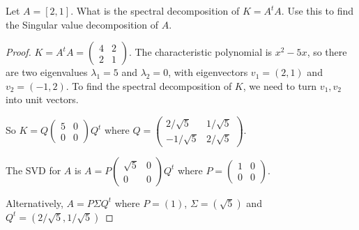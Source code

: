 \documentclass{amsart}
\begin{document}
	
\vspace{2em}

Let $A=[2,1]$. What is the spectral decomposition of $K=A^tA$. Use this to find the Singular value decomposition of $A$.

\begin{proof}
	 $K=A^tA=\begin{pmatrix}
	 	4&2\\2&1
	 \end{pmatrix}$. The characteristic polynomial is $x^2-5x$, so there are two eigenvalues $\lambda_1=5$ and $\lambda_2=0$, with eigenvectors $v_1= (2,1)$ and $v_2=(-1,2)$. To find the spectral decomposition of $K$, we need to turn $v_1,v_2$ into unit vectors.
	 
	 So $K=Q\begin{pmatrix}
	 	5&0\\0&0
	 \end{pmatrix}Q^{t}$ where $Q=\begin{pmatrix}
	 	2/\sqrt{5}&1/\sqrt{5}\\-1/\sqrt{5}&2/\sqrt{5}
	 \end{pmatrix}$.
	 
	 The SVD for $A$ is $A=P\begin{pmatrix}
	 	\sqrt{5}&0\\0&0
	 \end{pmatrix}Q^{t}$ where $P=\begin{pmatrix}
	 	1&0\\0&0
	 \end{pmatrix}$.
	 
	 Alternatively, $A=P\Sigma Q^t$ where $P=(1)$, $\Sigma=(\sqrt{5})$ and $Q^t=(2/\sqrt{5},1/\sqrt{5})$
\end{proof}
\end{document}
